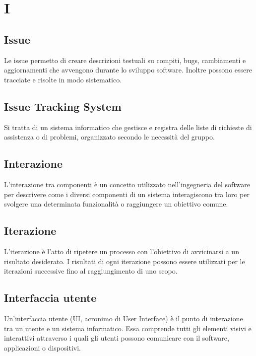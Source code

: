 \section{I}

\subsection{Issue}%
Le issue permetto di creare descrizioni testuali su compiti, bugs, cambiamenti e aggiornamenti che avvengono durante lo sviluppo software.  Inoltre possono essere tracciate e risolte in modo sistematico.

\subsection{Issue Tracking System}%
Si tratta di un sistema informatico che gestisce e registra delle liste di richieste di assistenza o di problemi, organizzato secondo le necessità del gruppo.

\subsection{Interazione}
L'interazione tra componenti è un concetto utilizzato nell'ingegneria del software per descrivere come i diversi componenti di un sistema interagiscono tra loro per svolgere una determinata funzionalità o raggiungere un obiettivo comune.

\subsection{Iterazione}%
L'iterazione è l'atto di ripetere un processo con l'obiettivo di avvicinarsi a un risultato desiderato.  I risultati di ogni iterazione possono essere utilizzati per le iterazioni successive fino al raggiungimento di uno scopo.

\subsection{Interfaccia utente}
Un'interfaccia utente (UI, acronimo di User Interface) è il punto di interazione tra un utente e un sistema informatico. Essa comprende tutti gli elementi visivi e interattivi attraverso i quali gli utenti possono comunicare con il software, applicazioni o dispositivi.
\clearpage